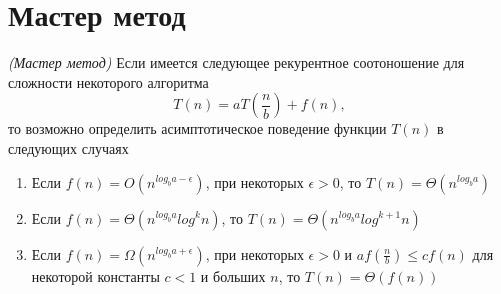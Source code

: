 \section{Мастер метод}

\begin{theorem}
\emph{(Мастер метод)}
\label{addAlgoMasterTheorem}
Если имеется следующее рекурентное соотоношение для сложности
некоторого алгоритма
\[
T\left( n \right ) = a T \left( \frac{n}{b} \right) + f\left( n \right ),
\]
то возможно определить асимптотическое поведение функции 
$T\left( n\right ) $ в следующих случаях
\begin{enumerate}
\item Если $f\left(n\right) = O\left( n^{log_ba - \epsilon}\right)$,
  при некоторых $\epsilon > 0$, то 
$T\left(n\right) = \Theta\left(n^{log_ba}\right)$
\item Если 
$f\left(n\right) = \Theta\left( n^{log_ba}log^{k}n\right)$, то 
$T\left(n\right) = \Theta\left(n^{log_ba}log^{k + 1}n\right)$
\item Если $f\left(n\right) = \Omega\left( n^{log_ba + \epsilon}\right)$,
  при некоторых $\epsilon > 0$ и $a f\left(\frac{n}{b}\right) \le c f
  \left( n \right)$ для некоторой константы $c < 1$ и больших $n$, то 
$T\left(n\right) = \Theta\left(f\left(n\right)\right)$
\end{enumerate}
\end{theorem}
